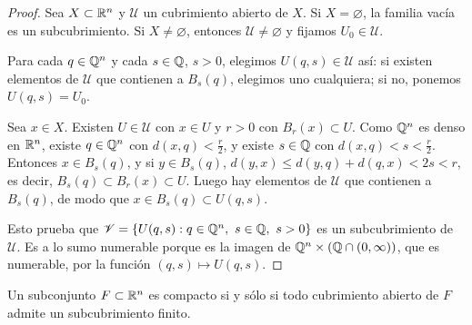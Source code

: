 \begin{proof}
  Sea \(X \subset \mathbb{R}^n\) y \(\mathscr{U}\) un cubrimiento abierto de \(X\). Si \(X = \varnothing\), la familia vacía es un subcubrimiento. Si \(X \neq \varnothing\), entonces \(\mathscr{U} \neq \varnothing\) y fijamos \(U_0 \in \mathscr{U}\).

  Para cada \(q \in \mathbb{Q}^n\) y cada \(s \in \mathbb{Q}\), \(s > 0\), elegimos \(U(q, s) \in \mathscr{U}\) así: si existen elementos de \(\mathscr{U}\) que contienen a \(B_s(q)\), elegimos uno cualquiera; si no, ponemos \(U(q, s) = U_0\).

  Sea \(x \in X\). Existen \(U \in \mathscr{U}\) con \(x \in U\) y \(r > 0\) con \(B_r(x) \subset U\). Como \(\mathbb{Q}^n\) es denso en \(\mathbb{R}^n\), existe \(q \in \mathbb{Q}^n\) con \(d(x, q) < \frac{r}{2}\), y existe \(s \in \mathbb{Q}\) con \(d(x, q) < s < \frac{r}{2}\). Entonces \(x \in B_s(q)\), y si \(y \in B_s(q)\), \(d(y, x) \leq d(y, q) + d(q, x) < 2s < r\), es decir, \(B_s(q) \subset B_r(x) \subset U\). Luego hay elementos de \(\mathscr{U}\) que contienen a \(B_s(q)\), de modo que \(x \in B_s(q) \subset U(q, s)\).

  Esto prueba que \(\mathscr{V} = \{ U(q, s) : q \in \mathbb{Q}^n, \ s \in \mathbb{Q}, \ s > 0 \}\) es un subcubrimiento de \(\mathscr{U}\). Es a lo sumo numerable porque es la imagen de \(\mathbb{Q}^n \times (\mathbb{Q} \cap (0, \infty))\), que es numerable, por la función \((q, s) \mapsto U(q, s)\).
\end{proof}

\begin{theorem}
  Un subconjunto \(F \subset \mathbb{R}^n\) es compacto si y sólo si todo cubrimiento abierto de \(F\) admite un subcubrimiento finito.
\end{theorem}

